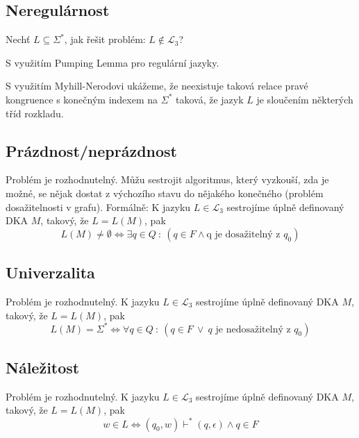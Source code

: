 \subsection{Neregulárnost}

\begin{compactitem}
    \item Nechť $L \subseteq \Sigma^*$, jak řešit problém: $L \not\in \mathcal{L}_3$? \begin{compactitem}

        \item S využitím Pumping Lemma pro regulární jazyky.

        \item S využitím Myhill-Nerodovi ukážeme, že neexistuje taková relace pravé kongruence s konečným indexem na $\Sigma^*$ taková, že jazyk $L$ je sloučením některých tříd rozkladu.
    \end{compactitem}
\end{compactitem}

\subsection{Prázdnost/neprázdnost}

Problém je rozhodnutelný. Můžu sestrojit algoritmus, který vyzkouší, zda je možné, se nějak dostat z výchozího stavu do nějakého konečného (problém dosažitelnosti v grafu). Formálně: K jazyku $L \in \mathcal{L}_3$ sestrojíme úplně definovaný DKA $M$, takový, že $L = L(M)$, pak $$ L(M) \not= \emptyset \Leftrightarrow \exists q \in Q ~:~ (q \in F \land \text{q je dosažitelný z } q_0)$$

\subsection{Univerzalita}

Problém je rozhodnutelný. K jazyku $L \in \mathcal{L}_3$ sestrojíme úplně definovaný DKA $M$, takový, že $L = L(M)$, pak $$ L(M) = \Sigma^* \Leftrightarrow \forall q \in Q ~:~ (q \in F ~\lor~ q \text{ je nedosažitelný z } q_0 )$$

\subsection{Náležitost}

Problém je rozhodnutelný. K jazyku $L \in \mathcal{L}_3$ sestrojíme úplně definovaný DKA $M$, takový, že $L = L(M)$, pak $$ w \in L \Leftrightarrow (q_0, w) \vdash^* (q, \epsilon) \land q \in F $$

